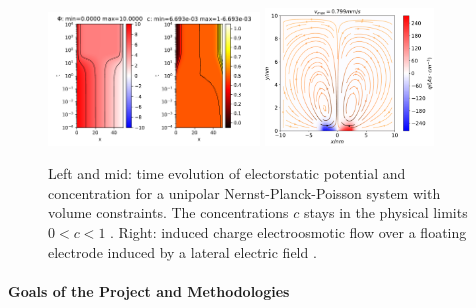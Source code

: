 \documentclass[a4paper,10pt]{article}
\begin{document}
\begin{figure}
  \centering
  \includegraphics[width=0.5\textwidth]{ccfg.pdf}
  \includegraphics[width=0.4\textwidth]{iceo.pdf}
   \caption{Left and mid: time evolution of electorstatic potential and concentration for
  a unipolar Nernst-Planck-Poisson system with volume constraints. The concentrations $c$
  stays in the physical limits $0<c<1$ \cite{CCFG2020}.
  Right: induced charge electroosmotic flow over a floating electrode induced by a lateral
  electric field \cite{FuhrmannEtAlECActa2019}. \label{fig:fv}}
\end{figure}


\paragraph{Goals of the Project and Methodologies}
\end{document}
